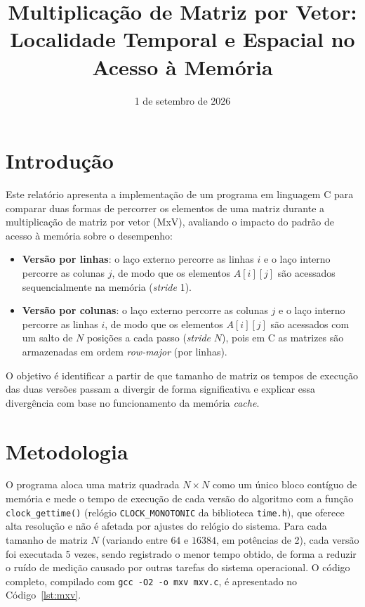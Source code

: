 \documentclass[a4paper,12pt]{article}
\title{Multiplicação de Matriz por Vetor: \\ Localidade Temporal e Espacial no Acesso à Memória}
\author{}
\date{1 de setembro de 2026}
\begin{document}
\maketitle

\section{Introdução}

Este relatório apresenta a implementação de um programa em linguagem C para
comparar duas formas de percorrer os elementos de uma matriz durante a
multiplicação de matriz por vetor (MxV), avaliando o impacto do padrão de
acesso à memória sobre o desempenho:

\begin{itemize}
    \item \textbf{Versão por linhas}: o laço externo percorre as linhas $i$ e o
    laço interno percorre as colunas $j$, de modo que os elementos $A[i][j]$ são
    acessados sequencialmente na memória (\emph{stride} 1).
    \item \textbf{Versão por colunas}: o laço externo percorre as colunas $j$ e o
    laço interno percorre as linhas $i$, de modo que os elementos $A[i][j]$ são
    acessados com um salto de $N$ posições a cada passo (\emph{stride} $N$), pois
    em C as matrizes são armazenadas em ordem \emph{row-major} (por linhas).
\end{itemize}

O objetivo é identificar a partir de que tamanho de matriz os tempos de execução
das duas versões passam a divergir de forma significativa e explicar essa
divergência com base no funcionamento da memória \emph{cache}.

\section{Metodologia}

O programa aloca uma matriz quadrada $N \times N$ como um único bloco contíguo de
memória e mede o tempo de execução de cada versão do algoritmo com a função
\texttt{clock\_gettime()} (relógio \texttt{CLOCK\_MONOTONIC} da biblioteca
\texttt{time.h}), que oferece alta resolução e não é afetada por ajustes do
relógio do sistema. Para cada tamanho de matriz $N$ (variando entre $64$ e
$16384$, em potências de 2), cada versão foi executada 5 vezes, sendo
registrado o menor tempo obtido, de forma a reduzir o ruído de medição causado
por outras tarefas do sistema operacional. O código completo, compilado com
\texttt{gcc -O2 -o mxv mxv.c}, é apresentado no Código~\ref{lst:mxv}.
\end{document}
